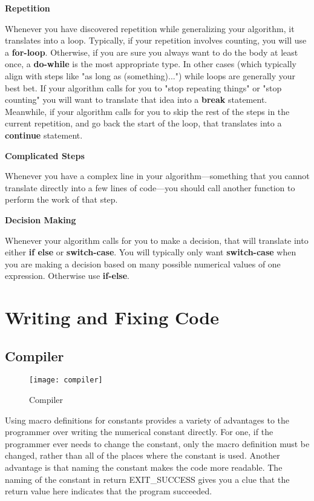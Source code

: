 \documentclass[11pt, a4paper]{article}
\begin{document}
\textbf{Repetition}

Whenever you have discovered repetition while generalizing your algorithm, it translates into a loop. Typically, if your repetition involves counting, you will use a \textbf{for-loop}. Otherwise, if you are sure you always want to do the body at least once, a \textbf{do-while} is the most appropriate type. In other cases (which typically align with steps like "as long as (something)...") while loops are generally your best bet. If your algorithm calls for you to "stop repeating things" or "stop counting" you will want to translate that idea into a \textbf{break} statement. Meanwhile, if your algorithm calls for you to skip the rest of the steps in the current repetition, and go back the start of the loop, that translates into a \textbf{continue} statement.



\textbf{Complicated Steps}

Whenever you have a complex line in your algorithm—something that you cannot translate directly into a few lines of code—you should call another function to perform the work of that step. 

\textbf{Decision Making}

Whenever your algorithm calls for you to make a decision, that will translate into either \textbf{if else} or \textbf{switch-case}. You will typically only want \textbf{switch-case} when you are making a decision based on many possible numerical values of one expression. Otherwise use \textbf{if-else}.


\section{Writing and Fixing Code}
\label{sec:writing_and_fixing_code}


\subsection{Compiler}
\label{sub:compiler}


\begin{figure}[htpb!]
	\centering
	\texttt{[image: compiler]}
	\caption{Compiler}%
	\label{fig:compiler}
\end{figure}




Using macro definitions for constants provides a variety of advantages to the programmer over writing the numerical constant directly. For one, if the programmer ever needs to change the constant, only the macro definition must be changed, rather than all of the places where the constant is used. Another advantage is that naming the constant makes the code more readable. The naming of the constant in return EXIT\_SUCCESS gives you a clue that the return value here indicates that the program succeeded. 
\end{document}
